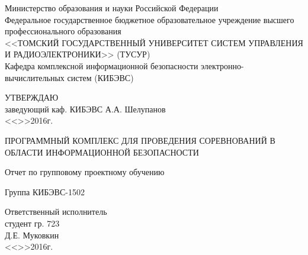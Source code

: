 \newpage
{}

\begin{center}
 Министерство образования и науки Российской Федерации\\
 Федеральное государственное бюджетное образовательное учреждение высшего профессионального образования\\
 <<ТОМСКИЙ ГОСУДАРСТВЕННЫЙ УНИВЕРСИТЕТ СИСТЕМ УПРАВЛЕНИЯ И РАДИОЭЛЕКТРОНИКИ>> (ТУСУР)\\
 Кафедра комплексной информационной безопасности электронно-вычислительных систем (КИБЭВС)\\
\end{center}

\vfill

\begin{flushright}
\begin{minipage}{0.45\textwidth}
 \begin{flushleft}
  УТВЕРЖДАЮ\\
  заведующий каф. КИБЭВС
  \underline{\hspace{3cm}}А.А. Шелупанов \\
  <<\underline{\hspace{1cm}}>>\underline{\hspace{3cm}}2016г.\\
 \end{flushleft}
\end{minipage}
\end{flushright}

\vfill

\begin{center}
ПРОГРАММНЫЙ КОМПЛЕКС ДЛЯ ПРОВЕДЕНИЯ СОРЕВНОВАНИЙ В ОБЛАСТИ ИНФОРМАЦИОННОЙ БЕЗОПАСНОСТИ

Отчет по групповому проектному обучению

Группа КИБЭВС-1502
\end{center}

\vfill
\begin{flushright}
\begin{minipage}{0.45\textwidth}
 \begin{flushleft}
  Ответственный исполнитель \\
  студент гр. 723 \\
  \underline{\hspace{3cm}}Д.Е. Муковкин \\
  <<\underline{\hspace{1cm}}>>\underline{\hspace{3cm}}2016г.\\
 \end{flushleft}
\end{minipage}
\end{flushright}

